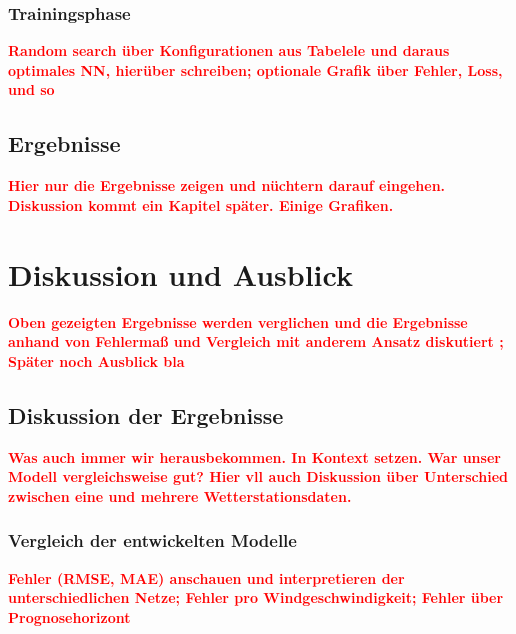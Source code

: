 \documentclass[
12pt, %
toc=listofnumbered, %
toc=chapterentrydotfill, %
numbers=noenddot, %
captions=tableheading, %
bibliography=numbered
]{scrreprt}
\let\Oldsection\section
\renewcommand{\section}{\FloatBarrier\Oldsection}
\let\Oldsubsection\subsection
\renewcommand{\subsection}{\FloatBarrier\Oldsubsection}
\newcommand{\highlight}[1]{\textbf{\textcolor{red}{#1}}}
\begin{document}
\subsection{Trainingsphase}
\highlight{Random search über Konfigurationen aus Tabelele und daraus optimales NN, hierüber schreiben; 
optionale Grafik über Fehler, Loss, und so}

\section{Ergebnisse}
\highlight{Hier nur die Ergebnisse zeigen und nüchtern darauf eingehen. Diskussion kommt ein Kapitel später. Einige Grafiken.}


\chapter{Diskussion und Ausblick}
\highlight{Oben gezeigten Ergebnisse werden verglichen und die Ergebnisse anhand von Fehlermaß und Vergleich mit anderem Ansatz diskutiert ;
Später noch Ausblick bla}

\section{Diskussion der Ergebnisse}
\highlight{Was auch immer wir herausbekommen. In Kontext setzen. War unser Modell vergleichsweise gut? Hier vll auch 
Diskussion über Unterschied zwischen eine und mehrere Wetterstationsdaten.}

\subsection{Vergleich der entwickelten Modelle}
\highlight{Fehler (RMSE, MAE) anschauen und interpretieren der unterschiedlichen Netze; 
Fehler pro Windgeschwindigkeit; Fehler über Prognosehorizont}
\end{document}
